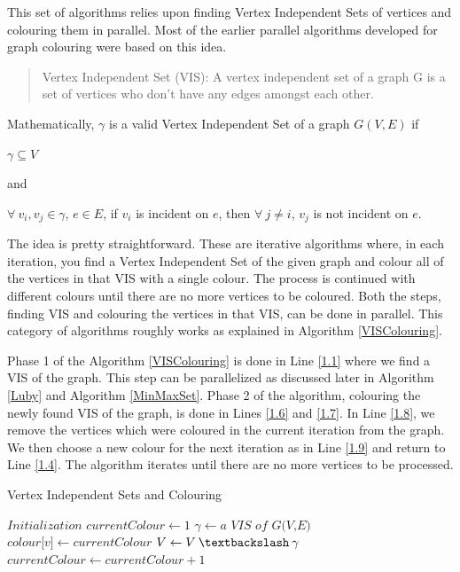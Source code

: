 \documentclass[MTech]{iitmdiss}
\begin{document}
This set of algorithms relies upon finding  Vertex Independent Sets of vertices and colouring them in parallel. Most of the earlier parallel algorithms developed for graph colouring were based on this idea.

\begin{verse}
Vertex Independent Set (VIS): A vertex independent set of a graph G is a set of vertices who don't have any edges amongst each other.   
\end{verse}

Mathematically, $\gamma$ is a valid Vertex Independent Set of a graph $G(V,E)$ if
\begin{center}
$\gamma \subseteq V$

and

$\forall \: v_{i}, v_{j}\in\gamma$, $e\in E$, if $v_{i}$ is incident on $e$, then $\forall \: j \neq i$, $v_{j}$ is not incident on $e$.
\end{center}

The idea is pretty straightforward. These are iterative algorithms where, in each iteration, you find a Vertex Independent Set of the given graph and colour all of the vertices in that VIS with a single colour. The process is continued with different colours until there are no more vertices to be coloured. Both the steps, finding VIS and colouring the vertices in that VIS, can be done in parallel. This category of algorithms roughly works as explained in Algorithm \ref{VISColouring}.

Phase 1 of the Algorithm \ref{VISColouring} is done in Line \ref{1.1} where we find a VIS of the graph. This step can be parallelized as discussed later in Algorithm \ref{Luby} and Algorithm \ref{MinMaxSet}. Phase 2 of the algorithm, colouring the newly found VIS of the graph, is done in Lines \ref{1.6} and \ref{1.7}. In Line \ref{1.8}, we remove the vertices which were coloured in the current iteration from the graph. We then choose a new colour for the next iteration as in Line \ref{1.9} and return to Line \ref{1.4}. The algorithm iterates until there are no more vertices to be processed.

\begin{algorithm}
\caption{Vertex Independent Sets and Colouring}\label{VISColouring}
\begin{algorithmic}[1]
\State $\textit{Initialization}$
\State $\textit{currentColour} \gets 1$
  \label{1.4}
\State $\gamma \gets \textit{a VIS of G(V,E)}$  \label{1.1}
  \label{1.6}
\State $\textit{colour[v]} \gets currentColour$ \label{1.7}
\EndFor
\State $V \gets V \: \textbackslash \: \gamma$ \label{1.8}
\State $\textit{currentColour} \gets \textit{currentColour}+1$ \label{1.9}
\EndWhile
\EndProcedure
\end{algorithmic}
\end{algorithm}
\end{document}
